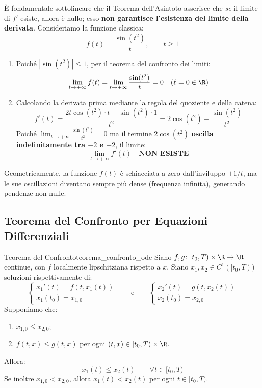 \begin{esame}
È fondamentale sottolineare che il Teorema dell'Asintoto asserisce che \emph{se} il limite di $f'$ esiste, allora è nullo; esso \textbf{non garantisce l'esistenza del limite della derivata}.
Consideriamo la funzione classica:
\[
    f(t) = \frac{\sin(t^2)}{t}, \qquad t \ge 1
\]
\begin{enumerate}
    \item Poiché $|\sin(t^2)| \le 1$, per il teorema del confronto dei limiti:
    \[
        \lim_{t \to +\infty} f(t) = \lim_{t \to +\infty} \frac{\sin(t^2)}{t} = 0 \quad (\ell = 0 \in \R)
    \]
    \item Calcolando la derivata prima mediante la regola del quoziente e della catena:
    \[
        f'(t) = \frac{2t \cos(t^2) \cdot t - \sin(t^2) \cdot 1}{t^2} = 2\cos(t^2) - \frac{\sin(t^2)}{t^2}
    \]
    Poiché $\lim_{t \to +\infty} \frac{\sin(t^2)}{t^2} = 0$ ma il termine $2\cos(t^2)$ \textbf{oscilla indefinitamente tra $-2$ e $+2$}, il limite:
    \[
        \lim_{t \to +\infty} f'(t) \quad \textbf{NON ESISTE}
    \]
\end{enumerate}
Geometricamente, la funzione $f(t)$ è schiacciata a zero dall'inviluppo $\pm 1/t$, ma le sue oscillazioni diventano sempre più dense (frequenza infinita), generando pendenze non nulle.
\end{esame}

\subsection{Teorema del Confronto per Equazioni Differenziali}

\begin{teorema}{Teorema del Confronto}{teorema_confronto_ode}
Siano $f, g \colon [t_0, T) \times \R \to \R$ continue, con $f$ localmente lipschitziana rispetto a $x$. Siano $x_1, x_2 \in C^1([t_0, T))$ soluzioni rispettivamente di:
\[
    \begin{cases} x_1'(t) = f(t, x_1(t)) \\ x_1(t_0) = x_{1,0} \end{cases} \qquad \text{e} \qquad \begin{cases} x_2'(t) = g(t, x_2(t)) \\ x_2(t_0) = x_{2,0} \end{cases}
\]
Supponiamo che:
\begin{enumerate}
    \item $x_{1,0} \le x_{2,0}$;
    \item $f(t, x) \le g(t, x)$ per ogni $(t, x) \in [t_0, T) \times \R$.
\end{enumerate}
Allora:
\begin{equation}
    \label{eq:confronto_tesi}
    x_1(t) \le x_2(t) \qquad \forall t \in [t_0, T)
\end{equation}
Se inoltre $x_{1,0} < x_{2,0}$, allora $x_1(t) < x_2(t)$ per ogni $t \in [t_0, T)$.
\end{teorema}

